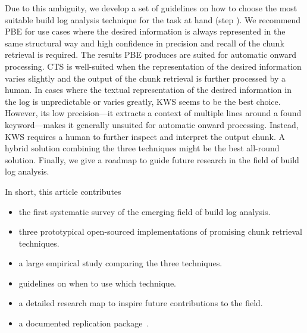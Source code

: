 \documentclass[10pt,journal,compsoc]{IEEEtran}
\newcommand\circlenum[1]{\raisebox{1.2pt}{\textcircled{\hspace{0.35pt}\scriptsize{\raisebox{-.4pt}{#1}}}}}
\begin{document}
Due to this ambiguity, we develop a set of guidelines
on how to choose the most suitable build log analysis
technique for the task at hand (step \circlenum{4}).
We recommend PBE for use cases where the desired information is always
represented in the same structural way and high confidence in
precision and recall of the chunk retrieval is required.
The results PBE produces are suited for automatic onward processing.
CTS is
well-suited when the representation of the desired information varies
slightly and the output of the chunk retrieval is further processed by
a human.
In cases where the textual representation of the desired
information in the log is unpredictable or varies greatly, KWS seems
to be the best choice.
However, its low precision---it extracts a
context of multiple lines around a found keyword---makes it generally
unsuited for automatic onward processing.
Instead, KWS requires a human
to further inspect and interpret the output chunk.
A hybrid solution combining the three techniques might be the best
all-round solution.
Finally, we give a roadmap to guide future research in the field
of build log analysis.

In short, this article contributes
\begin{itemize}
\item the first systematic survey of the emerging field of build log
analysis.
\item three prototypical open-sourced implementations of
promising chunk retrieval techniques.
\item a large empirical study comparing the three techniques.
\item guidelines on when to use which technique.
\item a detailed research map to inspire future contributions to the
field.
\item a documented replication package~\cite{brandt2020chunk-replication}.
\end{itemize}
\end{document}
